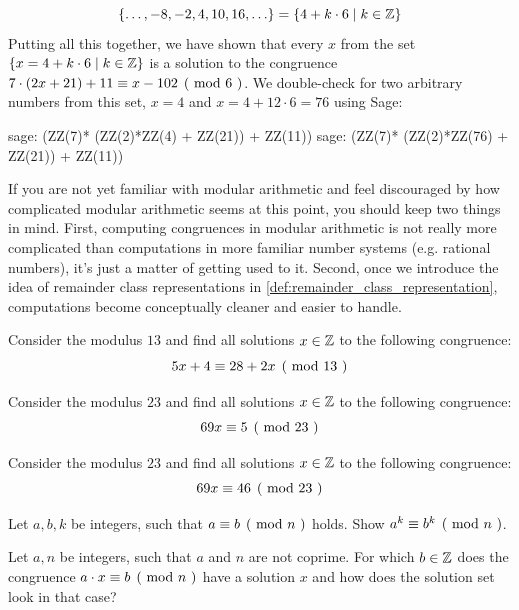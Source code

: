 \begin{example}
$$
\{\ldots, -8,-2, 4,10, 16,\ldots\} = \{4+k\cdot 6 \;|\; k\in \mathbb{Z}\}
$$
Putting all this together, we have shown that every $x$ from the set $\{x=4+k\cdot 6 \;|\; k\in \mathbb{Z}\}$ is a solution to the congruence $\kongru{7\cdot(2x+21) + 11}{x-102}{6}$. We double-check for two arbitrary numbers from this set, $x=4$ and $x=4 + 12\cdot 6 = 76$ using  Sage:
\begin{sagecommandline}
sage: (ZZ(7)* (ZZ(2)*ZZ(4) + ZZ(21)) + ZZ(11))  %
sage: (ZZ(7)* (ZZ(2)*ZZ(76) + ZZ(21)) + ZZ(11))  %
\end{sagecommandline}
\end{example}
If you are not yet familiar with modular arithmetic and feel discouraged by how complicated modular arithmetic seems at this point, you should keep two things in mind. First, computing congruences in modular arithmetic is not really more complicated than computations in more familiar number systems (e.g. rational numbers), it's just a matter of getting used to it. Second, once we introduce the idea of remainder class representations in \ref{def:remainder_class_representation}, computations become conceptually cleaner and easier to handle.
\begin{exercise}
\label{exercise_congruence_in_F13}
Consider the modulus $13$ and find all solutions $x\in \mathbb{Z}$ to the following congruence: $$\kongru{5x+4}{28+2x}{13}$$
\end{exercise}
\begin{exercise}Consider the modulus $23$ and find all solutions $x\in \mathbb{Z}$ to the following congruence: $$\kongru{69x}{5}{23}$$
\end{exercise}
\begin{exercise}Consider the modulus $23$ and find all solutions $x\in \mathbb{Z}$ to the following congruence: $$\kongru{69x}{46}{23}$$
\end{exercise}
\begin{exercise}
Let $a,b,k$ be integers, such that $\kongru{a}{b}{n}$ holds. Show $\kongru{a^k}{b^k}{n}$.
\end{exercise}
\begin{exercise}
Let $a,n$ be integers, such that $a$ and $n$ are not coprime. For which $b\in\mathbb{Z}$ does the congruence $\kongru{a\cdot x}{b}{n}$ have a solution $x$ and how does the solution set look in that case?
\end{exercise}
